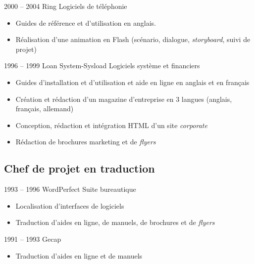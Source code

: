 \documentclass[12pt,a4paper,roman]{moderncv}
\begin{document}
\cventry
    {2000 – 2004}
    {Ring}
    {Logiciels de téléphonie}
    {}
    {}
    {
      \begin{itemize}
      \item Guides de référence et d'utilisation en anglais.
      \item Réalisation d'une animation en Flash (scénario, dialogue,
        \textit{storyboard}, suivi de projet)
    \end{itemize}}


\cventry
    {1996 – 1999}
    {Loan System-Sysload}
    {Logiciels système et financiers}
    {}
    {}
    {
      \begin{itemize}
      \item Guides d'installation et d'utilisation et aide en ligne en anglais
        et en français
      \item Création et rédaction d'un magazine d'entreprise en 3 langues
        (anglais, français, allemand)
      \item Conception, rédaction et intégration HTML d'un site
        \textit{corporate}
      \item Rédaction de brochures marketing et de \textit{flyers}
      \end{itemize}
    }


\subsection{Chef de projet en traduction}

\cventry
    {1993 – 1996}
    {WordPerfect}
    {Suite bureautique}
    {}
    {}
    {
      \begin{itemize}
      \item Localisation d'interfaces de logiciels
      \item Traduction d'aides en ligne, de manuels, de brochures et de
        \textit{flyers}
      \end{itemize}
    }


\cventry
    {1991 – 1993}
    {Gecap}
    {}
    {}
    {}
    {
      \begin{itemize}
      \item Traduction d'aides en ligne et de manuels
      \end{itemize}
    }
\end{document}
